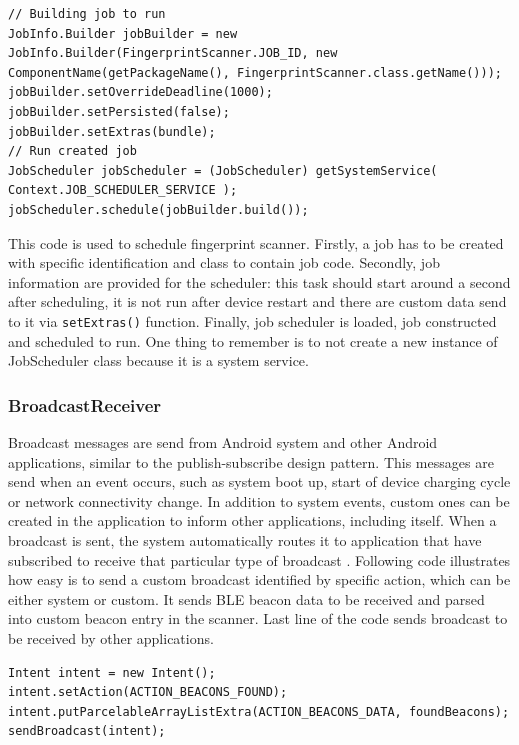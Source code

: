 \begin{lstlisting}[caption=Schedule Firngerprint scanner job.]
// Building job to run
JobInfo.Builder jobBuilder = new JobInfo.Builder(FingerprintScanner.JOB_ID, new ComponentName(getPackageName(), FingerprintScanner.class.getName()));
jobBuilder.setOverrideDeadline(1000);
jobBuilder.setPersisted(false);
jobBuilder.setExtras(bundle);
// Run created job
JobScheduler jobScheduler = (JobScheduler) getSystemService( Context.JOB_SCHEDULER_SERVICE );
jobScheduler.schedule(jobBuilder.build());
\end{lstlisting}

This code is used to schedule fingerprint scanner. Firstly, a job has to be created with specific identification and class to contain job code. Secondly, job information are provided for the scheduler: this task should start around a second after scheduling, it is not run after device restart and there are custom data send to it via \verb|setExtras()| function. Finally, job scheduler is loaded, job constructed and scheduled to run. One thing to remember is to not create a new instance of JobScheduler class because it is a system service.

\subsubsection{BroadcastReceiver}\label{subsubsec:BroadcastReceiver}
Broadcast messages are send from Android system and other Android applications, similar to the publish-subscribe design pattern. This messages are send when an event occurs, such as system boot up, start of device charging cycle or network connectivity change. In addition to system events, custom ones can be created in the application to inform other applications, including itself. When a broadcast is sent, the system automatically routes it to application that have subscribed to receive that particular type of broadcast \cite{AD}. Following code illustrates how easy is to send a custom broadcast identified by specific action, which can be either system or custom. It sends BLE beacon data to be received and parsed into custom beacon entry in the scanner. Last line of the code sends broadcast to be received by other applications.

\begin{lstlisting}[caption=Send broadcast with BLE beacons found.]
Intent intent = new Intent();
intent.setAction(ACTION_BEACONS_FOUND);
intent.putParcelableArrayListExtra(ACTION_BEACONS_DATA, foundBeacons);
sendBroadcast(intent);
\end{lstlisting}

